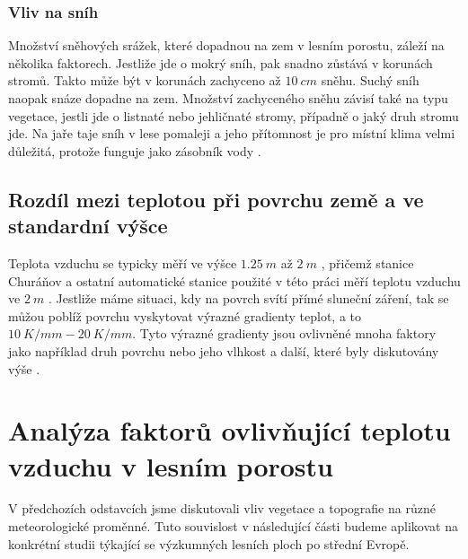 \subsubsection{Vliv na sníh}\label{chap:vlivnasnih}
Množství sněhových srážek, které dopadnou na zem v lesním porostu, záleží na několika faktorech. Jestliže jde o mokrý sníh, pak snadno zůstává v korunách stromů. Takto může být v korunách zachyceno až $\SI{10}{cm}$ sněhu. Suchý sníh naopak snáze dopadne na zem. Množství zachyceného sněhu závisí také na typu vegetace, jestli jde o listnaté nebo jehličnaté stromy, případně o jaký druh stromu jde. Na jaře taje sníh v lese pomaleji a jeho přítomnost je pro místní klima velmi důležitá, protože funguje jako zásobník vody \parencite{alma}.

\subsection{Rozdíl mezi teplotou při povrchu země a ve standardní výšce}
Teplota vzduchu se typicky měří ve výšce $\SI{1.25}{m}$ až $\SI{2}{m}$ \parencite{wmo2021}, přičemž stanice Churáňov a ostatní automatické stanice použité v této práci měří teplotu vzduchu ve $\SI{2}{m}$ \parencite{churanov}. Jestliže máme situaci, kdy na povrch svítí přímé sluneční záření, tak se můžou poblíž povrchu vyskytovat výrazné gradienty teplot, a to $\SI{10}{K/mm}-\SI{20}{K/mm}$. Tyto výrazné gradienty jsou ovlivněné mnoha faktory jako například druh povrchu nebo jeho vlhkost a další, které byly diskutovány výše \parencite{arya2001}. 

\section{Analýza faktorů ovlivňující teplotu vzduchu v lesním porostu}
V předchozích odstavcích jsme diskutovali vliv vegetace a topografie na různé meteorologické proměnné. Tuto souvislost v následující části budeme aplikovat na konkrétní studii týkající se výzkumných lesních ploch po střední Evropě.

